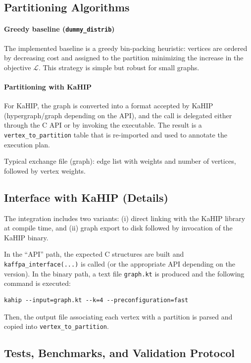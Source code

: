 \documentclass[11pt,a4paper]{article}
\begin{document}
\subsection{Partitioning Algorithms}

\paragraph{Greedy baseline (\texttt{dummy\_distrib})}

The implemented baseline is a greedy bin-packing heuristic: vertices are ordered by decreasing cost and assigned to the partition minimizing the increase in the objective $\mathcal{L}$. This strategy is simple but robust for small graphs.

\paragraph{Partitioning with KaHIP}

For KaHIP, the graph is converted into a format accepted by KaHIP (hypergraph/graph depending on the API), and the call is delegated either through the C API or by invoking the executable. The result is a \texttt{vertex\_to\_partition} table that is re-imported and used to annotate the execution plan.

Typical exchange file (graph): edge list with weights and number of vertices, followed by vertex weights.

\subsection{Interface with KaHIP (Details)}

The integration includes two variants: (i) direct linking with the KaHIP library at compile time, and (ii) graph export to disk followed by invocation of the KaHIP binary.

In the ``API'' path, the expected C structures are built and \texttt{kaffpa\_interface(...)} is called (or the appropriate API depending on the version). In the binary path, a text file \texttt{graph.kt} is produced and the following command is executed:
\begin{verbatim}
kahip --input=graph.kt --k=4 --preconfiguration=fast
\end{verbatim}

Then, the output file associating each vertex with a partition is parsed and copied into \texttt{vertex\_to\_partition}.

\subsection{Tests, Benchmarks, and Validation Protocol}
\end{document}
